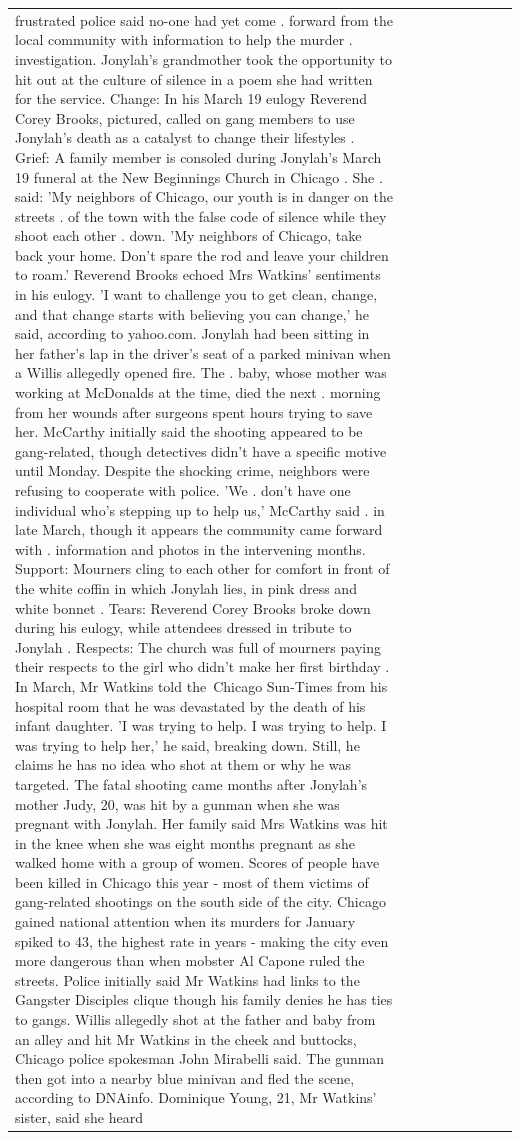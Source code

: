 \begin{table}[H]
\begin{tabular}{lllrlllll}
frustrated police said no-one had yet come . forward from the local community with information to help the murder . investigation. Jonylah's grandmother took the opportunity to hit out at the culture of silence in a poem she had written for the service. Change: In his March 19 eulogy Reverend Corey Brooks, pictured, called on gang members to use Jonylah's death as a catalyst to change their lifestyles . Grief: A family member is consoled during Jonylah's March 19 funeral at the New Beginnings Church in Chicago . She . said: 'My neighbors of Chicago, our youth is in danger on the streets . of the town with the false code of silence while they shoot each other . down. 'My neighbors of Chicago, take back your home. Don't spare the rod and leave your children to roam.' Reverend Brooks echoed Mrs Watkins' sentiments in his eulogy. 'I want to challenge you to get clean, change, and that change starts with believing you can change,' he said, according to yahoo.com. Jonylah had been sitting in her father's lap in the driver's seat of a parked minivan when a Willis allegedly opened fire. The . baby, whose mother was working at McDonalds at the time, died the next . morning from her wounds after surgeons spent hours trying to save her. McCarthy initially said the shooting appeared to be gang-related, though detectives didn't have a specific motive until Monday. Despite the shocking crime, neighbors were refusing to cooperate with police. 'We . don't have one individual who's stepping up to help us,' McCarthy said . in late March, though it appears the community came forward with . information and photos in the intervening months. Support: Mourners cling to each other for comfort in front of the white coffin in which Jonylah lies, in pink dress and white bonnet . Tears: Reverend Corey Brooks broke down during his eulogy, while attendees dressed in tribute to Jonylah . Respects: The church was full of mourners paying their respects to the girl who didn't make her first birthday . In March, Mr Watkins told the Chicago Sun-Times from his hospital room that he was devastated by the death of his infant daughter. 'I was trying to help. I was trying to help. I was trying to help her,' he said, breaking down. Still, he claims he has no idea who shot at them or why he was targeted. The fatal shooting came months after Jonylah's mother Judy, 20, was hit by a gunman when she was pregnant with Jonylah. Her family said Mrs Watkins was hit in the knee when she was eight months pregnant as she walked home with a group of women. Scores of people have been killed in Chicago this year - most of them victims of gang-related shootings on the south side of the city. Chicago gained national attention when its murders for January spiked to 43, the highest rate in years - making the city even more dangerous than when mobster Al Capone ruled the streets. Police initially said Mr Watkins had links to the Gangster Disciples clique though his family denies he has ties to gangs. Willis allegedly shot at the father and baby from an alley and hit Mr Watkins in the cheek and buttocks, Chicago police spokesman John Mirabelli said. The gunman then got into a nearby blue minivan and fled the scene, according to DNAinfo. Dominique Young, 21, Mr Watkins' sister, said she heard 
\end{tabular}
\end{table}
